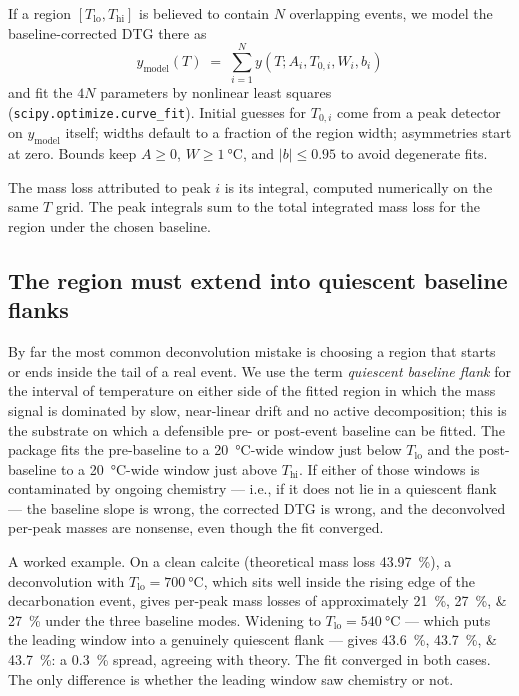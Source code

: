 \documentclass[11pt]{article}
\newcommand{\code}[1]{\texttt{#1}}
\begin{document}
If a region $[T_{\mathrm{lo}}, T_{\mathrm{hi}}]$ is believed to contain
$N$ overlapping events, we model the baseline-corrected DTG there as
\[
  y_{\mathrm{model}}(T) \;=\; \sum_{i=1}^{N} y(T; A_i, T_{0,i}, W_i, b_i)
\]
and fit the $4N$ parameters by nonlinear least squares
(\code{scipy.optimize.curve\_fit}). Initial guesses for $T_{0,i}$ come
from a peak detector on $y_{\mathrm{model}}$ itself; widths default
to a fraction of the region width; asymmetries start at zero. Bounds
keep $A \ge 0$, $W \ge \qty{1}{\celsius}$, and $|b| \le 0.95$ to avoid
degenerate fits.

The mass loss attributed to peak $i$ is its integral, computed
numerically on the same $T$ grid. The peak integrals sum to the total
integrated mass loss for the region under the chosen baseline.

\subsection{The region must extend into quiescent baseline flanks}

By far the most common deconvolution mistake is choosing a region that
starts or ends inside the tail of a real event.  We use the term
\emph{quiescent baseline flank} for the interval of temperature on
either side of the fitted region in which the mass signal is dominated
by slow, near-linear drift and no active decomposition; this is the
substrate on which a defensible pre- or post-event baseline can be
fitted.  The package fits the pre-baseline to a
\qty{20}{\celsius}-wide window just below $T_{\mathrm{lo}}$ and the
post-baseline to a \qty{20}{\celsius}-wide window just above
$T_{\mathrm{hi}}$.  If either of those windows is contaminated by
ongoing chemistry --- i.e., if it does not lie in a quiescent flank
--- the baseline slope is wrong, the corrected DTG is wrong, and the
deconvolved per-peak masses are nonsense, even though the fit
converged.

A worked example.  On a clean calcite (theoretical mass loss
\qty{43.97}{\percent}), a deconvolution with
$T_{\mathrm{lo}} = \qty{700}{\celsius}$, which sits well inside the
rising edge of the decarbonation event, gives per-peak mass losses of
approximately \qtylist{21;27;27}{\percent} under the three baseline
modes.  Widening to $T_{\mathrm{lo}} = \qty{540}{\celsius}$ --- which
puts the leading window into a genuinely quiescent flank --- gives
\qtylist{43.6;43.7;43.7}{\percent}: a \qty{0.3}{\percent} spread,
agreeing with theory.  The fit converged in both cases.  The only
difference is whether the leading window saw chemistry or not.
\end{document}

